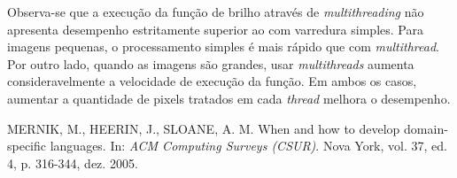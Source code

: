\documentclass[a4paper, 10pt, conference]{ieeeconf}
\begin{document}

Observa-se que a execução da função de brilho através de \textit{multithreading} não apresenta desempenho estritamente superior ao com varredura simples. Para imagens pequenas, o processamento simples é mais rápido que com \textit{multithread}. Por outro lado, quando as imagens são grandes, usar \textit{multithreads} aumenta consideravelmente a velocidade de execução da função. Em ambos os casos, aumentar a quantidade de pixels tratados em cada \textit{thread} melhora o desempenho.


\begin{thebibliography}{99}

 MERNIK, M., HEERIN, J., SLOANE, A. M. When and how to develop domain-specific languages. In: \textit{ACM Computing Surveys (CSUR)}. Nova York, vol. 37, ed. 4, p. 316-344, dez. 2005.

\end{thebibliography}
\end{document}
